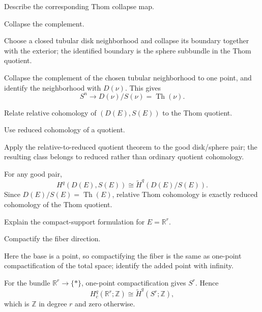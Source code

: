 \begin{exercise}\label{exr:viii31-12}
Describe the corresponding Thom collapse map.
\end{exercise}
\begin{hint}
Collapse the complement.

Choose a closed tubular disk neighborhood and collapse its boundary together with the exterior; the identified boundary is the sphere subbundle in the Thom quotient.
\end{hint}
\begin{solution}
Collapse the complement of the chosen tubular neighborhood to one point, and identify the neighborhood with \(D(\nu)\). This gives
\[
S^n\longrightarrow D(\nu)/S(\nu)=\operatorname{Th}(\nu).
\]
\end{solution}

\begin{exercise}\label{exr:viii31-13}
Relate relative cohomology of $(D(E),S(E))$ to the Thom quotient.
\end{exercise}
\begin{hint}
Use reduced cohomology of a quotient.

Apply the relative-to-reduced quotient theorem to the good disk/sphere pair; the resulting class belongs to reduced rather than ordinary quotient cohomology.
\end{hint}
\begin{solution}
For any good pair,
\[
H^q(D(E),S(E))\cong \widetilde H^q(D(E)/S(E)).
\]
Since \(D(E)/S(E)=\operatorname{Th}(E)\), relative Thom cohomology is exactly reduced cohomology of the Thom quotient.
\end{solution}

\begin{exercise}\label{exr:viii31-14}
Explain the compact-support formulation for $E=\mathbb R^r$.
\end{exercise}
\begin{hint}
Compactify the fiber direction.

Here the base is a point, so compactifying the fiber is the same as one-point compactification of the total space; identify the added point with infinity.
\end{hint}
\begin{solution}
For the bundle \(\mathbb R^r\to\{\ast\}\), one-point compactification gives \(S^r\). Hence
\[
H_c^q(\mathbb R^r;\mathbb Z)\cong\widetilde H^q(S^r;\mathbb Z),
\]
which is \(\mathbb Z\) in degree \(r\) and zero otherwise.
\end{solution}

